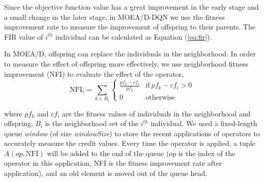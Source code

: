 \documentclass[journal]{IEEEtran}
\newcommand{\TODO}[1]{\textcolor[rgb]{1.00,0.40,0.22}{#1}}
\begin{document}
Since the objective function value has a great improvement in the early stage and a small change in the later stage, in MOEA/D-DQN we use the fitness improvement rate to measure the improvement of offspring to their parents.
The FIR value of $i^{th}$ individual can be calculated as Equation (\ref{eq:fir}).


In MOEA/D, offspring can replace the individuals in the neighborhood. In order to measure the effect of offspring more effectively, we use neighborhood fitness improvement (NFI) to evaluate the effect of the operator,
\begin{equation}
  \text{NFI}_{i}= \sum_{k \in B_i}
  \left\{
  \begin{array}{ll}
    \frac{pf_{k}-cf_{i}}{pf_{k}} & \text{if}\ pf_{k}-cf_{i}>0 \\

    0                            & \text{otherwise}
  \end{array}
  \right.
  \label{eq:nfi}
\end{equation}

where $pf_{k}$ and $cf_{i}$ are the fitness values of individuals in the neighborhood and offspring, $B_i$ is the neighborhood set of the $i^{th}$ individual.
% 
We used a fixed-length queue \textit{window} (of size \textit{windowSize}) to store the recent applications of operators to accurately measure the credit values.
Every time the operator is applied, a tuple $A (op, \text{NFI})$ will be added to the end of the queue ($op$ is the index of the operator in this application, NFI is the fitness improvement rate after application), and an old element is moved out of the queue head.
\end{document}
